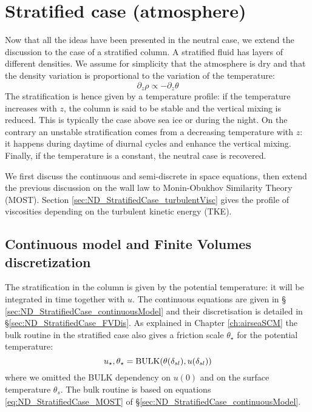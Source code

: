 \section{Stratified case (atmosphere)}
Now that all the ideas have been presented in the neutral case,
we extend the discussion to the case of a stratified column.
A stratified fluid has layers of different densities.
We assume for simplicity that the atmosphere
is dry and that the density variation is
proportional to the variation of the temperature:
\begin{equation}
	\partial_z \rho \propto
	- \partial_z \theta
\end{equation}
The stratification is hence given by a temperature profile:
if the temperature increases with $z$, the column is said
to be stable and the vertical mixing is reduced. This is
typically the case above sea ice or during the night.
On the contrary an unstable stratification comes from
a decreasing temperature with $z$: it happens
during daytime of diurnal cycles and enhance the
vertical mixing.
%
Finally, if the temperature is a constant, the neutral case is
recovered.
\par
We first discuss the continuous and semi-discrete in space
equations, then extend the previous discussion on the wall law to
Monin-Obukhov Similarity Theory (MOST).
Section \ref{sec:ND_StratifiedCase_turbulentVisc} gives the
profile of viscosities depending on the turbulent kinetic energy
(TKE).
\subsection{Continuous model and Finite Volumes discretization}
The stratification in the column is given by the
potential temperature: it will be integrated in time
together with $u$.
The continuous equations are given in \S
\ref{sec:ND_StratifiedCase_continuousModel}
and their discretisation is detailed in
\S \ref{sec:ND_StratifiedCase_FVDis}.
As explained in Chapter \ref{ch:airseaSCM}
the bulk routine in the stratified case
also gives a friction scale $\theta_\star$
for the potential temperature:
\begin{equation}
	u_\star, \theta_\star =
	{\rm BULK}(\theta(\delta_{sl}),
	u(\delta_{sl}))
\end{equation}
where we omitted the BULK dependency on
$u(0)$ and on the surface temperature $\theta_s$.
The bulk routine is based on equations
\eqref{eq:ND_StratifiedCase_MOST} of
\S \ref{sec:ND_StratifiedCase_continuousModel}.
